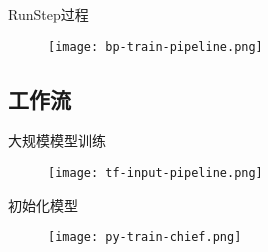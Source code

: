 \begin{frame}{RunStep过程}
  \begin{figure}
    \centering
    \texttt{[image: bp-train-pipeline.png]}
  \end{figure}
\end{frame}

\subsection{工作流}

\begin{frame}{大规模模型训练}
  \begin{figure}
    \centering
    \texttt{[image: tf-input-pipeline.png]}
  \end{figure}
\end{frame}

\begin{frame}{初始化模型}
  \begin{figure}
    \centering
    \texttt{[image: py-train-chief.png]}
  \end{figure}
\end{frame}

